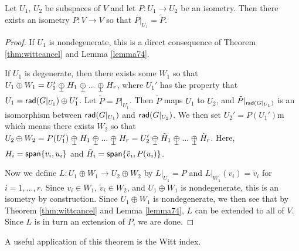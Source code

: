 \begin{thm} Let $U_1$, $U_2$ be subspaces of $V$ and let $P : U_1\to U_2$ be an isometry. Then there exists an isometry $P:V\to V$ so that $P|_{U_1} = \tilde{P}$.
\end{thm}

\begin{proof}
    If $U_1$ is nondegenerate, this is a direct consequence of Theorem \ref{thm:wittcancel} and Lemma \ref{lemma74}.

    If $U_1$ is degenerate, then there exists some $W_1$ so that $U_1\oplus W_1 = U_1' \orthoplus H_1\orthoplus...\orthoplus H_r$, where $U_1'$ has the property that $U_1 = \operatorname{\textsf{rad}}(G|_{U_1})\oplus U_1'$. Let $\tilde{P} = P|_{U_1}$. Then $\tilde{P}$ maps $U_1$ to $U_2$, and $\tilde{P}|_{\operatorname{\textsf{rad}}(G|_{U_1})}$ is an isomorphism between $\operatorname{\textsf{rad}}(G|_{U_1})$ and $\operatorname{\textsf{rad}}(G|_{U_2})$. We then set $U_2' = P(U_1')$m which means there exists $W_2$ so that $U_2\oplus W_2 = P(U_1')\orthoplus H_1\orthoplus...\orthoplus H_r = U_2' \orthoplus\tilde{H}_1\orthoplus...\orthoplus \tilde{H}_r$. Here, $H_i = \operatorname{\textsf{span}}\{v_i,u_i\}$ and $\tilde{H}_i = \operatorname{\textsf{span}}\{\tilde{v}_i,P(u_i)\}$.

    Now we define $L : U_1\oplus W_1 \to U_2 \oplus W_2$ by $L|_{U_1} = P$ and $L|_{W_1}(v_i) = \tilde{v}_i$ for $i=1,...,r$. Since $v_i \in W_1$, $\tilde{v}_i\in W_2$, and $U_1\oplus W_1$ is nondegenerate, this is an isometry by construction. Since $U_1\oplus W_1$ is nondegenerate, we then see that by Theorem \ref{thm:wittcancel} and Lemma \ref{lemma74}, $L$ can be extended to all of $V$. Since $L$ is in turn an extension of $P$, we are done.
\end{proof}
\begin{remark*}
    A useful application of this theorem is the Witt index.
\end{remark*}
